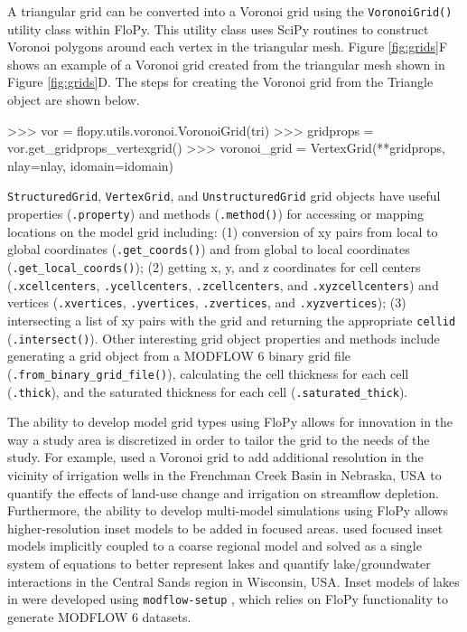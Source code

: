\documentclass[11pt, oneside]{article}  	%
\begin{document}
A triangular grid can be converted into a Voronoi grid using the \texttt{VoronoiGrid()} utility class within FloPy. This utility class uses SciPy routines \citep{2020SciPy-NMeth} to construct Voronoi polygons around each vertex in the triangular mesh. Figure \ref{fig:grids}F shows an example of a Voronoi grid created from the triangular mesh shown in Figure \ref{fig:grids}D. The steps for creating the Voronoi grid from the Triangle object are shown below.

\begin{python}
>>> vor = flopy.utils.voronoi.VoronoiGrid(tri)
>>> gridprops = vor.get_gridprops_vertexgrid()
>>> voronoi_grid = VertexGrid(**gridprops, nlay=nlay, idomain=idomain)
\end{python}

\texttt{StructuredGrid}, \texttt{VertexGrid}, and \texttt{UnstructuredGrid} grid objects have useful properties (\texttt{.property}) and methods (\texttt{.method()}) for accessing or mapping locations on the model grid including: (1) conversion of xy pairs from local to global coordinates (\texttt{.get\_coords()}) and from global to local coordinates (\texttt{.get\_local\_coords()}); (2) getting x, y, and z coordinates for cell centers (\texttt{.xcellcenters}, \texttt{.ycellcenters}, \texttt{.zcellcenters}, and \texttt{.xyzcellcenters}) and vertices (\texttt{.xvertices}, \texttt{.yvertices}, \texttt{.zvertices}, and \texttt{.xyzvertices}); (3) intersecting a list of xy pairs with the grid and returning the appropriate \texttt{cellid} (\texttt{.intersect()}). Other interesting grid object properties and methods include generating a grid object from a MODFLOW 6 binary grid file (\texttt{.from\_binary\_grid\_file()}), calculating the cell thickness for each cell (\texttt{.thick}), and the saturated thickness for each cell (\texttt{.saturated\_thick}).

The ability to develop model grid types using FloPy allows for innovation in the way a study area is discretized in order to tailor the grid to the needs of the study. For example, \cite{Moussa2018} used a Voronoi grid to add additional resolution in the vicinity of irrigation wells in the Frenchman Creek Basin in Nebraska, USA to quantify the effects of land-use change and irrigation on streamflow depletion. Furthermore, the ability to develop multi-model simulations using FloPy allows higher-resolution inset models to be added in focused areas. \cite{fienen2022simulation} used focused inset models implicitly coupled to a coarse regional model and solved as a single system of equations to better represent lakes and quantify lake/groundwater interactions in the Central Sands region in Wisconsin, USA. Inset models of lakes in \cite{fienen2022simulation} were developed using \texttt{modflow-setup} \citep{leaf2022modflow}, which relies on FloPy functionality to generate MODFLOW 6 datasets.
\end{document}
